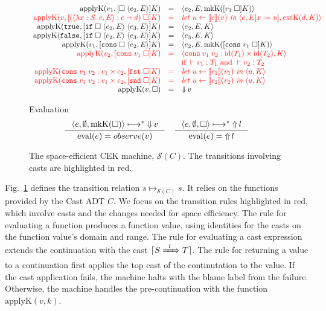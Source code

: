 \documentclass[runningheads]{llncs}
\newcommand{\infr}[2]{\inference{#1}{#2}}
\newcommand{\highlight}[1]{{\color{red} #1}}
\newcommand{\sidecond}[1]{\text{if}\;#1}
\newcommand{\figequalto}[3]{#1 & = & #2 & #3 \\}
\newcommand{\figequaltoH}[3]{\highlight{#1} & \highlight{=} & \highlight{#2} & 
\highlight{#3} \\}
\newcommand{\figref}[1]{Fig.~\ref{#1}}
\newcommand{\SMachine}[1]{\ensuremath{\mathcal{S}(#1)}}
\newcommand{\error}[1]{\ensuremath{\mathop{\Uparrow}#1}}
\newcommand{\Pfunc}[2]{\ensuremath{#1 \shortrightarrow #2}}
\newcommand{\Pprod}[2]{\ensuremath{#1 \times #2}}
\newcommand{\elam}[3]{\lambda#1:#2.\;#3}
\newcommand{\eapp}[2]{#1\;#2}
\newcommand{\eif}[3]{\mathtt{if}\;#1\;#2\;#3}
\newcommand{\econs}[2]{\mathtt{cons} \; #1 \; #2}
\newcommand{\efst}[1]{\mathtt{fst} \; #1}
\newcommand{\esnd}[1]{\mathtt{snd} \; #1}
\newcommand{\ecast}[2]{\ensuremath{#1 : #2}}
\newcommand{\ccast}[3]{#1 \xRightarrow[]{\enskip #2 \enskip} #3}
\newcommand{\vtrue}[0]{\mathtt{true}}
\newcommand{\vfalse}[0]{\mathtt{false}}
\newcommand{\vfunc}[4]{\langle\elam{#1}{#2}{#3},#4\rangle}
\newcommand{\vcons}[2]{\econs{#1}{#2}}
\newcommand{\sexpr}[3]{\ensuremath{\langle#1,#2,#3\rangle}}
\newcommand{\scont}[2]{\ensuremath{\langle#1,#2\rangle}}
\newcommand{\shalt}[1]{\ensuremath{\mathop{\Downarrow} #1}}
\newcommand{\Knil}[0]{\Box}
\newcommand{\Kcons}[2]{[#1]#2}
\newcommand{\closure}[2]{\langle#1,#2\rangle}
\newcommand{\FappXO}[2]{\eapp{\square}{\closure{#1}{#2}}}
\newcommand{\FappOX}[1]{\eapp{#1}{\square}}
\newcommand{\Fif}[3]{\eif{\square}{\closure{#1}{#3}}{\closure{#2}{#3}}}
\newcommand{\FconsXO}[2]{\econs{\square}{\closure{#1}{#2}}}
\newcommand{\FconsOX}[1]{\econs{#1}{\square}}
\newcommand{\Ffst}[0]{\efst{\square}}
\newcommand{\Fsnd}[0]{\esnd{\square}}
\newcommand{\mlet}[3]{\ensuremath{
\mathit{let}\ {#1\leftarrow#2}\ \mathit{in}\;#3}}
\newcommand{\denote}[1]{\ensuremath{\llbracket #1 \rrbracket}}
\newcommand{\translate}[1]{\ensuremath{\lceil#1\rceil}}
\newcommand{\id}[1]{\ensuremath{\mathrm{id}(#1)}}
\newcommand{\mkContName}[0]{\ensuremath{\mathrm{mkK}}}
\newcommand{\mkCont}[1]{\ensuremath{\mkContName(#1)}}
\newcommand{\extContName}[0]{\ensuremath{\mathrm{extK}}}
\newcommand{\extCont}[2]{\ensuremath{\extContName(#1,#2)}}
\newcommand{\applyContName}[0]{\ensuremath{\mathrm{applyK}}}
\newcommand{\applyCont}[2]{\ensuremath{\applyContName(#1,#2)}}
\newcommand{\valuetyping}[2]{\ensuremath{\vdash #1 : #2}}
\newcommand{\casttyping}[3]{\ensuremath{\vdash #1 : #2 \Longrightarrow #3}}
\newcommand{\transitivelyreduceto}[2]{\ensuremath{#1 \longmapsto^{*} #2}}
\newcommand{\reducetoS}[3]{\ensuremath{#2 \longmapsto_{\SMachine{#1}} #3}}
\newcommand{\evalto}[2]{\ensuremath{\mathrm{eval}(#1)=#2}}
\begin{document}
\begin{figure}[tp]
	\fbox{$\applyCont{v}{k}=s$}
	\[
	\begin{array}{rclr}
	\figequalto{\applyCont{v_1}{\Kcons{\FappXO{e_2}{E}}{K}}}{\sexpr{e_2}{E}{
			\mkCont{\Kcons{\FappOX{v_1}}{K}}}
	}{}
	\figequaltoH{
		\applyCont{v}{\Kcons{\FappOX{(\ecast{\vfunc{x}{S}{e}{E}}{\Pfunc{c}{d}})}}{K}}
	}{
	    \mlet{u}{\denote{c}(v)}{\sexpr{e}{E[x:=u]}{\extCont{d}{K}}}
	}{}
	\figequalto{\applyCont{\vtrue}{\Kcons{\Fif{e_2}{e_3}{E}}{K}}}{\sexpr{e_2}{E}{K}}{}
	\figequalto{\applyCont{\vfalse}{\Kcons{\Fif{e_2}{e_3}{E}}{K}}}{\sexpr{e_3}{E}{K}}{}
	\figequalto{\applyCont{v_1}{\Kcons{\FconsXO{e_2}{E}}{K}}}{
		\sexpr{e_2}{E}{\mkCont{\Kcons{\FconsOX{v_1}}{K}}}
	}{}
	\figequaltoH{\applyCont{v_2}{\Kcons{\FconsOX{v_1}}{K}}}{
		\scont{\ecast{\vcons{v_1}{v_2}}{\Pprod{\id{T_1}}{\id{T_2}}}}{K}
	}{}
	& & 
	\highlight{\sidecond{
		\valuetyping{v_1}{T_1}
		\text{ and }
		\valuetyping{v_2}{T_2}
	}}
	\\
	\figequaltoH{
		\applyCont{\ecast{\vcons{v_1}{v_2}}{\Pprod{c_1}{c_2}}}{\Kcons{\Ffst}{K}}
	}{
	    \mlet{u}{\denote{c_1}(v_1)}{\scont{u}{K}}
	}{}
	\figequaltoH{
		\applyCont{\ecast{\vcons{v_1}{v_2}}{\Pprod{c_1}{c_2}}}{\Kcons{\Fsnd}{K}}
	}{
	    \mlet{u}{\denote{c_2}(v_2)}{\scont{u}{K}}
	}{}
	\figequalto{\applyCont{v}{\Knil}}{\shalt{v}}{}
	\end{array}
	\]
	
	\fbox{\evalto{e}{o}} Evaluation
	\[
	\inference{
		\transitivelyreduceto{\sexpr{e}{\emptyset}{\mkCont{\Knil}}}{\shalt{v}}
	}{
		\evalto{e}{observe(v)}
	} \quad
	\infr{
		\transitivelyreduceto{\sexpr{e}{\emptyset}{\Knil}}{\error{l}}
	}{
		\evalto{e}{\error{l}}}
	\]
	\caption{The space-efficient CEK machine, \SMachine{C}.
          The transitions involving casts are highlighted in red.}
	\label{fig:semachine-dynamics}
\end{figure}

\figref{fig:semachine-dynamics} defines the transition relation
$\reducetoS{C}{s}{s}$. It relies on the functions provided by the Cast
ADT $C$.
%
We focus on the transition rules highlighted in red, which involve
casts and the changes needed for space efficiency.
%
The rule for evaluating a function produces a function value, using
identities for the casts on the function value's domain and range.
%
The rule for evaluating a cast expression extends the continuation
with the cast \translate{\ccast{S}{l}{T}}.
%
The rule for returning a value to a continuation first applies the top
cast of the continutation to the value. If the cast application fails,
the machine halts with the blame label from the failure. Otherwise,
the machine handles the pre-continuation with the function
$\applyCont{v}{k}$.
\end{document}
